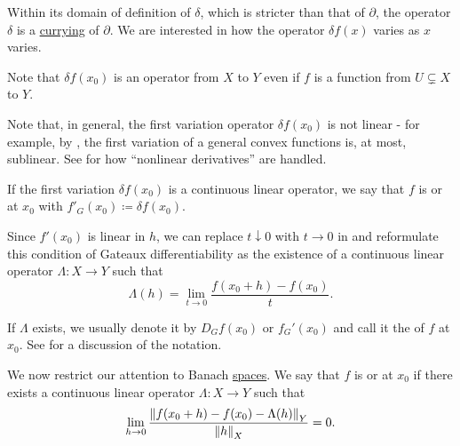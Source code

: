 \begin{definition}
\begin{DefEnum}
    Within its domain of definition of \( \delta \), which is stricter than that of \( \partial \), the operator \( \delta \) is a \hyperref[def:function/argument]{currying} of \( \partial \). We are interested in how the operator \( \delta f(x) \) varies as \( x \) varies.

    Note that \( \delta f(x_0) \) is an operator from \( X \) to \( Y \) even if \( f \) is a function from \( U \subsetneq X \) to \( Y \).

    Note that, in general, the first variation operator \( \delta f(x_0) \) is not linear - for example, by , the first variation of a general convex functions is, at most, sublinear. See  for how \enquote{nonlinear derivatives} are handled.

    If the first variation \( \delta f(x_0) \) is a continuous linear operator, we say that \( f \) is  or  at \( x_0 \) with  \( f'_G(x_0) \coloneqq \delta f(x_0) \).

    Since \( f'(x_0) \) is linear in \( h \), we can replace \( t \downarrow 0 \) with \( t \to 0 \) in  and reformulate this condition of Gateaux differentiability as the existence of a continuous linear operator \( \Lambda: X \to Y \) such that
    \begin{equation}\label{def:differentiability/gateaux/condition}
      \Lambda(h) = \lim_{t \to 0} \frac {f(x_0 + h) - f(x_0)} t.
    \end{equation}

    If \( \Lambda \) exists, we usually denote it by \( D_G f(x_0) \) or \( f_G'(x_0) \) and call it the  of \( f \) at \( x_0 \). See  for a discussion of the notation.

    We now restrict our attention to Banach \hyperref[def:banach_space]{spaces}. We say that \( f \) is  or  at \( x_0 \) if there exists a continuous linear operator \( \Lambda: X \to Y \) such that
    \begin{equation}\label{def:differentiability/frechet/condition}
      \lim_{h \to 0} \frac {\left\Vert f(x_0 + h) - f(x_0) - \Lambda(h) \right\Vert_Y} {\left\Vert h \right\Vert_X} = 0.
    \end{equation}


\end{DefEnum}
\end{definition}

